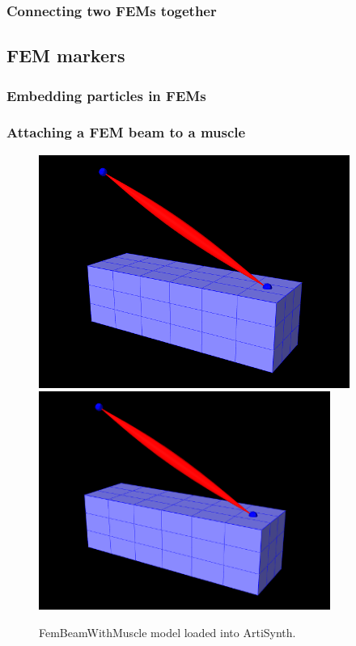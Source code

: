 
\subsubsection{Connecting two FEMs together}


\subsection{FEM markers}

\subsubsection{Embedding particles in FEMs}

\subsubsection{Attaching a FEM beam to a muscle}

\begin{figure}[h]
\begin{center}
\iflatexml
 \includegraphics[]{images/FemBeamWithMuscle}
\else
 \includegraphics[width=3.75in]{images/FemBeamWithMuscle}
\fi
\end{center}
\caption{FemBeamWithMuscle model loaded into ArtiSynth.}
\label{FemBeamWithMuscle:fig}
\end{figure}

